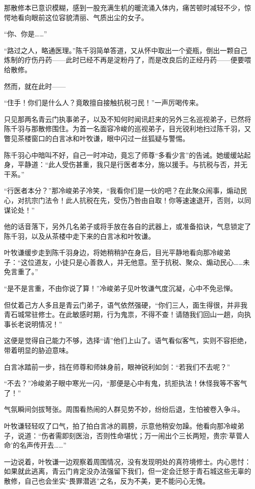 那散修本已意识模糊，感到一股充满生机的暖流涌入体内，痛苦顿时减轻不少，惊愕地看向眼前这位容貌清丽、气质出尘的女子。

“你、你是……”

“路过之人，略通医理。”陈千羽简单答道，又从怀中取出一个瓷瓶，倒出一颗自己炼制的疗伤丹药——此时已经不再是淀粉丹了，而是改良后的正经丹药——便要喂给散修。

然而，就在此时——

“住手！你们是什么人？竟敢擅自接触抗税刁民！”一声厉喝传来。

只见那两名青云门执事弟子，以及不知何时闻讯赶来的另外三名巡视弟子，已然将陈千羽与那散修围住。为首一名面容冷峻的巡视弟子，目光锐利地扫过陈千羽，又瞥见茶楼窗口的白言冰和叶牧谦，眼中闪过一丝狐疑与警惕。

陈千羽心中暗叫不好，自己一时冲动，竟忘了师尊“多看少言”的告诫。她缓缓站起身，平静道：“此人受伤甚重，我只是行医者本分，施以援手。与抗税与否，并无干系。”

“行医者本分？”那冷峻弟子冷笑，“我看你们是一伙的吧？在此聚众闹事，煽动民心，对抗宗门法令！此人抗税在先，受伤乃咎由自取！你等速速退开，否则，以同谋论处！”

他的话音落下，另外几名弟子或将手放在各自的武器上，或准备掐诀，气息锁定了陈千羽，以及从茶楼中走下来的白言冰和叶牧谦。

叶牧谦缓步走到陈千羽身边，将她稍稍护在身后，目光平静地看向那冷峻弟子：“这位道友，小徒只是心善救人，并无他意。至于抗税、聚众、煽动民心……未免言重了。”

“是不是言重，不由你说了算！”冷峻弟子见叶牧谦气度沉凝，心中不免忌惮。

但仗着己方人多且是青云门弟子，语气依然强硬，“你们三人，面生得很，并非我青石城常驻修士。在此敏感时期，行为鬼祟，不得不查！请随我们回山一趟，向执事长老说明情况！”

这便是觉得自己能力不够，选择“请”他们上山了。语气看似客气，实则不容拒绝，带着明显的胁迫意味。

白言冰踏前一步，挡在师尊和师妹身前，眼神锐利如剑：“若我们不去呢？”

“不去？”冷峻弟子眼中寒光一闪，“那便是心中有鬼，抗拒执法！休怪我等不客气了！”

气氛瞬间剑拔弩张。周围看热闹的人群见势不妙，纷纷后退，生怕被卷入争斗。

叶牧谦轻轻叹了口气，拍了拍白言冰的肩膀，示意他稍安勿躁。他看向那冷峻弟子，说道：“伤者需即刻医治，否则性命堪忧；万一闹出个三长两短，贵宗‘草菅人命’的名声传开去……”

一边说着，叶牧谦一边观察着周围情况，没有发现明处的真符境修士。内心思忖：如果就此逃离，青云门肯定没办法强留下我们，但一定会迁怒于青石城这些无辜的散修，自己也会坐实“畏罪潜逃”之名，反为不美，更不能问心无愧。

